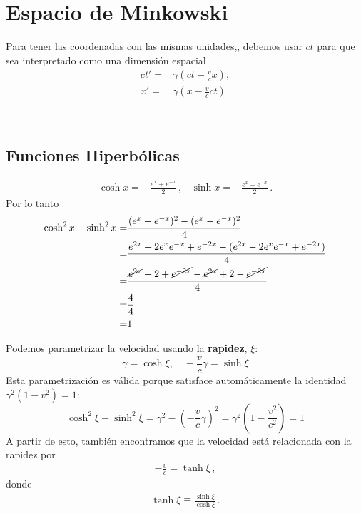 \documentclass[11pt,a4paper]{book}
\begin{document}
\section{Espacio de Minkowski}

Para tener las coordenadas con las mismas unidades,, debemos usar $ct$ para que sea interpretado como una dimensión espacial
\begin{align}
ct' =& \gamma\left(ct-\frac{v}{c}x\right),\\
x'=&\gamma\left(x-\frac{v}{c}ct\right)
\end{align}

\

\subsection{Funciones Hiperbólicas}
\begin{align*}
    \cosh x =& \frac{{e}^{x}+{e}^{-x}}{2}\,,&
\sinh x =& \frac{{e}^{x}-{e}^{-x}}{2}\,.
\end{align*}
Por lo tanto
\begin{align*}
    \cosh^2x - \sinh^2x =& \frac{({e}^{x}+{e}^{-x})^2
    -({e}^{x}-{e}^{-x})^2}{4}\\
    =&\frac{{e}^{2x}+2{e}^{x}{e}^{-x}+{e}^{-2x}
-({e}^{2x}-2{e}^{x}{e}^{-x}+{e}^{-2x})}{4}\\
=&\frac{\cancel{{e}^{2x}}+2+\cancel{{e}^{-2x}}
-\cancel{{e}^{2x}}+2-\cancel{{e}^{-2x}}}{4}\\
=&\frac{4}{4}\\
=&1
\end{align*}

Podemos parametrizar la velocidad usando la \textbf{rapidez}, $\xi$:
\[ \gamma = \cosh\xi, \quad -\frac{v}{c}\gamma = \sinh\xi \]
Esta parametrización es válida porque satisface automáticamente la identidad $\gamma^2(1-v^2)=1$:
\[ \cosh^2\xi - \sinh^2\xi = \gamma^2 - \left(-\frac{v}{c}\gamma\right)^2 = \gamma^2\left(1-\frac{v^2}{c^2}\right) = 1 \]
A partir de esto, también encontramos que la velocidad está relacionada con la rapidez por 
\begin{align*}
    -\frac{v}{c} = \tanh\xi\,,
\end{align*}
donde
\begin{align*}
\tanh\xi \equiv \frac{\sinh\xi}{\cosh\xi}\,.    
\end{align*}
\end{document}
